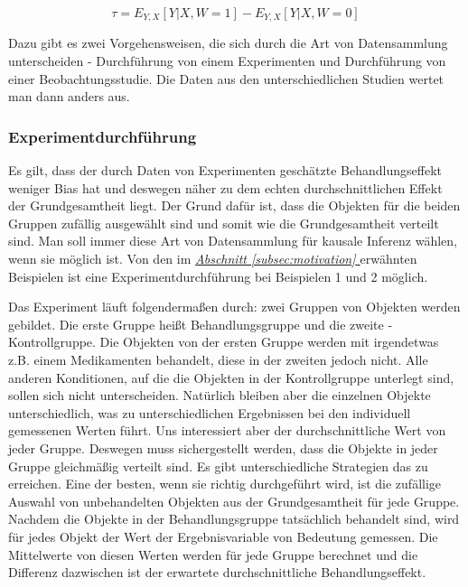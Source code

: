 \documentclass[12pt,a4paper,twoside]{scrartcl}
\numberwithin{equation}{section}
\newcommand{\refsec}[1]{\emph{\hyperref[#1]{Abschnitt \ref*{#1} }}}
\begin{document}
\begin{equation}\label{eq:1.4}
  \tau = E_{Y,X}[Y|X,W = 1] - E_{Y,X}[Y|X,W = 0]
\end{equation}  

\noindent
Dazu gibt es zwei Vorgehensweisen, die sich durch die Art von Datensammlung unterscheiden - Durchführung von einem Experimenten und Durchführung von einer Beobachtungsstudie. Die Daten aus den unterschiedlichen Studien wertet man dann anders aus.\par

\subsubsection{Experimentdurchführung}\label{subsubsec:experimentdurchführung}

Es gilt, dass der durch Daten von Experimenten geschätzte Behandlungseffekt weniger Bias hat und deswegen näher zu dem echten durchschnittlichen Effekt der Grundgesamtheit liegt. Der Grund dafür ist, dass die Objekten für die beiden Gruppen zufällig ausgewählt sind und somit wie die Grundgesamtheit verteilt sind\cite{rubin1974estimating}. Man soll immer diese Art von Datensammlung für kausale Inferenz wählen, wenn sie möglich ist. Von den im \refsec{subsec:motivation} erwähnten Beispielen ist eine Experimentdurchführung bei Beispielen 1 und 2 möglich. 

\clearpage
\noindent
Das Experiment läuft folgendermaßen durch: zwei Gruppen von Objekten  werden gebildet. Die erste Gruppe heißt Behandlungsgruppe und die zweite  - Kontrollgruppe. Die Objekten von der ersten Gruppe werden mit irgendetwas z.B. einem Medikamenten behandelt, diese in der zweiten jedoch nicht. Alle anderen Konditionen, auf die die Objekten in der Kontrollgruppe unterlegt sind, sollen sich nicht unterscheiden. Natürlich bleiben aber die einzelnen Objekte unterschiedlich, was zu unterschiedlichen Ergebnissen bei den individuell gemessenen Werten  führt. Uns interessiert aber der durchschnittliche Wert von jeder Gruppe. Deswegen muss sichergestellt werden, dass die Objekte in jeder Gruppe gleichmäßig verteilt sind. Es gibt unterschiedliche Strategien das zu erreichen. Eine der besten, wenn sie richtig durchgeführt wird, ist die zufällige Auswahl von unbehandelten Objekten aus der Grundgesamtheit für jede Gruppe. Nachdem die Objekte in der Behandlungsgruppe tatsächlich behandelt sind, wird für jedes Objekt der Wert der Ergebnisvariable von Bedeutung gemessen. Die Mittelwerte von diesen Werten werden für jede Gruppe berechnet und die Differenz dazwischen ist der erwartete durchschnittliche Behandlungseffekt.  
\par
\end{document}

